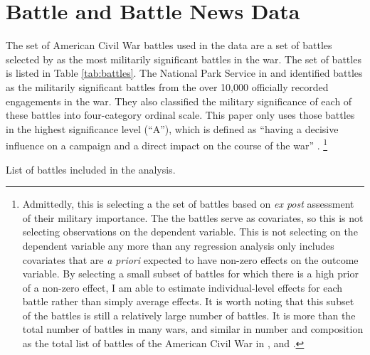 \documentclass[11pt, oneside, article]{memoir}
\begin{document}
\section{Battle and Battle News Data}
\label{sec:battle-data}

The set of American Civil War battles used in the data are a set of \AcwBattleNumSigA{} battles selected by \textcite{CWSAC1993} as the most militarily significant battles in the war. 
The set of battles is listed in Table \ref{tab:battles}.
The National Park Service in \textcite{CWSAC1993} and \textcite{CWSAC1993b} identified \AcwBattleNum{} battles as the militarily significant battles from the over 10,000 officially recorded engagements in the war.
They also classified the military significance of each of these battles into four-category ordinal scale.
This paper only uses those battles in the highest significance level (``A''), which is defined as ``having a decisive influence on a campaign and a direct impact on the course of the war'' \parencite{CWSAC1993}.%
\footnote{
  Admittedly, this is selecting a the set of battles based on \textit{ex post} assessment of their military importance.
  The the battles serve as covariates, so this is not selecting observations on the dependent variable.
  This is not selecting on the dependent variable any more than any regression analysis only includes covariates that are \textit{a priori} expected to have non-zero effects on the outcome variable.
  By selecting a small subset of battles for which there is a high prior of a non-zero effect, I am able to estimate individual-level effects for each battle rather than simply average effects.
  It is worth noting that this subset of the battles is still a relatively large number of battles. It is more than the total number of battles in many wars, and similar in number and composition as the total list of battles of the American Civil War in \textcite{Livermore1900}, \textcite{Bodart1908} and \textcite{cdb90}.
}

\begin{table}
  \tiny
  \caption{List of battles included in the analysis.}
  \label{tab:battles}
\end{table}
\end{document}
